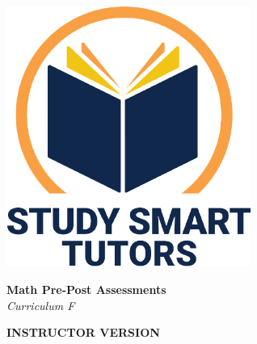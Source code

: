 \documentclass[12pt]{article}
\begin{document}
\newpage


\newpage





\newpage
\thispagestyle{empty}
\vspace*{\fill}

\vspace*{10cm}






\thispagestyle{empty}

\vspace*{\fill}

\vspace*{3cm}

\begin{center}

    \includegraphics[width=0.6\textwidth]{SST_Color_Logo.png} %
    
    \vspace{2cm} %
    

    
    \Huge \textbf{ Math Pre-Post Assessments}\\
    \LARGE \textit{Curriculum F}\\[1cm]
 \vspace{2cm}

    \Huge \textbf{INSTRUCTOR VERSION}
    
   
    
    \vfill %
    
\end{center}

\newpage
\thispagestyle{empty}
\end{document}
